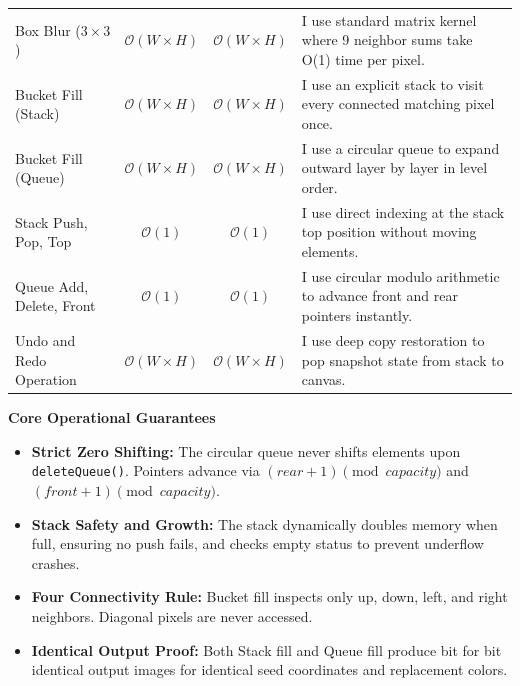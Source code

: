 \documentclass[9.5pt,a4paper]{article}
\begin{document}
\begin{table}[h!]
\begin{tabularx}{\textwidth}{l c c X}
\addlinespace[1pt]
Box Blur ($3 \times 3$) & $\mathcal{O}(W \times H)$ & $\mathcal{O}(W \times H)$ & I use standard matrix kernel where 9 neighbor sums take O(1) time per pixel. \\
\addlinespace[1pt]
Bucket Fill (Stack) & $\mathcal{O}(W \times H)$ & $\mathcal{O}(W \times H)$ & I use an explicit stack to visit every connected matching pixel once. \\
\addlinespace[1pt]
Bucket Fill (Queue) & $\mathcal{O}(W \times H)$ & $\mathcal{O}(W \times H)$ & I use a circular queue to expand outward layer by layer in level order. \\
\addlinespace[1pt]
Stack Push, Pop, Top & $\mathcal{O}(1)$ & $\mathcal{O}(1)$ & I use direct indexing at the stack top position without moving elements. \\
\addlinespace[1pt]
Queue Add, Delete, Front & $\mathcal{O}(1)$ & $\mathcal{O}(1)$ & I use circular modulo arithmetic to advance front and rear pointers instantly. \\
\addlinespace[1pt]
Undo and Redo Operation & $\mathcal{O}(W \times H)$ & $\mathcal{O}(W \times H)$ & I use deep copy restoration to pop snapshot state from stack to canvas. \\
\bottomrule
\end{tabularx}
\end{table}

\vspace{0.1cm}
\begin{center}
    {\large \textbf{Core Operational Guarantees}}
\end{center}
\begin{itemize}[noitemsep,topsep=1.5pt,parsep=1pt]
    \item \textbf{Strict Zero Shifting:} The circular queue never shifts elements upon \texttt{deleteQueue()}. Pointers advance via $(rear + 1) \pmod{capacity}$ and $(front + 1) \pmod{capacity}$.
    \item \textbf{Stack Safety and Growth:} The stack dynamically doubles memory when full, ensuring no push fails, and checks empty status to prevent underflow crashes.
    \item \textbf{Four Connectivity Rule:} Bucket fill inspects only up, down, left, and right neighbors. Diagonal pixels are never accessed.
    \item \textbf{Identical Output Proof:} Both Stack fill and Queue fill produce bit for bit identical output images for identical seed coordinates and replacement colors.
\end{itemize}
\end{document}
